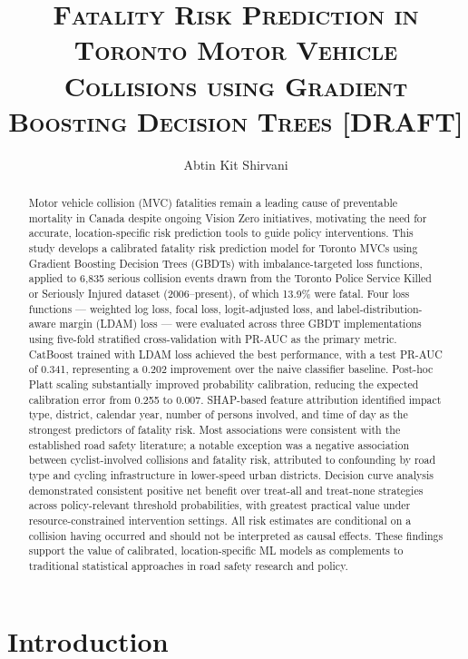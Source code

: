 \documentclass{article}
\title{\bfseries\scshape Fatality Risk Prediction in Toronto Motor Vehicle Collisions using Gradient Boosting Decision Trees [DRAFT]}
\author{Abtin Kit Shirvani}
\begin{document}
\maketitle

\begin{abstract}
    Motor vehicle collision (MVC) fatalities remain a leading cause of preventable mortality in Canada despite ongoing Vision Zero initiatives, motivating the need for accurate, location-specific risk prediction tools to guide policy interventions. This study develops a calibrated fatality risk prediction model for Toronto MVCs using Gradient Boosting Decision Trees (GBDTs) with imbalance-targeted loss functions, applied to 6,835 serious collision events drawn from the Toronto Police Service Killed or Seriously Injured dataset (2006–present), of which 13.9\% were fatal. Four loss functions — weighted log loss, focal loss, logit-adjusted loss, and label-distribution-aware margin (LDAM) loss — were evaluated across three GBDT implementations using five-fold stratified cross-validation with PR-AUC as the primary metric. CatBoost trained with LDAM loss achieved the best performance, with a test PR-AUC of 0.341, representing a 0.202 improvement over the naive classifier baseline. Post-hoc Platt scaling substantially improved probability calibration, reducing the expected calibration error from 0.255 to 0.007. SHAP-based feature attribution identified impact type, district, calendar year, number of persons involved, and time of day as the strongest predictors of fatality risk. Most associations were consistent with the established road safety literature; a notable exception was a negative association between cyclist-involved collisions and fatality risk, attributed to confounding by road type and cycling infrastructure in lower-speed urban districts. Decision curve analysis demonstrated consistent positive net benefit over treat-all and treat-none strategies across policy-relevant threshold probabilities, with greatest practical value under resource-constrained intervention settings. All risk estimates are conditional on a collision having occurred and should not be interpreted as causal effects. These findings support the value of calibrated, location-specific ML models as complements to traditional statistical approaches in road safety research and policy.
\end{abstract}

\section{Introduction}
\end{document}
